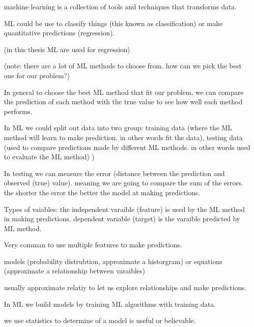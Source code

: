 
machine learning is a collection of tools and techniques that transforms data.

ML could be use to classify things (this known as classification)
or make quantitative predictions (regression).

(in this thesis ML are used for regression)

(note: there are a lot of ML methods to choose from. how can we pick the best one for our problem?)

In general to choose the best ML method that fit our problem,
we can compare the prediction of each method with the true value to see how well each method performs.

In ML we could split out data into two group:
training data (where the ML method will learn to make prediction. in other words fit the data),
testing data (used to compare predictions made by different ML methods. in other words used to evaluate the ML method) )

In testing we can measure the error (distance between the prediction and observed (true) value).
meaning we are going to compare the sum of the errors.
the shorter the error the better the model at making predictions. 

Types of vaiables:
the independent varaible (feature) is used by the ML method in making predictions.
dependent variable (target) is the varaible predicted by ML method.

Very comman to use multiple features to make predictions.


models (probability distrubtion, approximate a historgram) or equations (approximate a relationship between varaibles)

usually approximate relatiy to let us explore relationships and make predictions.

In ML we build models by training ML algorithms with training data.

we use statistics to determine of a model is useful or believable. 




